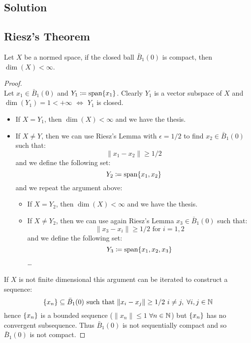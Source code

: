 \subsection*{Solution}

\subsection{Riesz's Theorem}
Let $X$ be a normed space, if the closed ball $\bar{B}_1(0)$ is compact, then $\dim(X)<\infty$.

\begin{proof}
    \hspace*{\fill}\\ %
    Let $x_1 \in \bar{B}_1(0)$ and $Y_1 \coloneqq \operatorname{span}\{x_1 \}$. Clearly $Y_1$ is a vector subspace of $X$ and $\dim(Y_1)=1<+\infty$ $\iff$ $Y_1$ is closed.
    \begin{itemize}
        \item If $X=Y_1$, then $\dim(X) < \infty$ and we have the thesis.
        \item If $X \neq Y$, then we can use Riesz's Lemma with $\epsilon = 1/2$ to find $x_2 \in \bar{B}_1(0)$ such that:
            \[ \| x_1 - x_2 \| \geq 1/2 \]
            and we define the following set:
            \[ Y_2 \coloneqq \operatorname{span}\{x_1, x_2 \} \]
        and we repeat the argument above:
        \begin{itemize}
            \item If $X=Y_2$, then $\dim(X) < \infty$ and we have the thesis.
            \item If $X \neq Y_2$, then we can use again Riesz's Lemma $x_3 \in \bar{B}_1(0)$ such that:
                \[ \| x_3 - x_i \| \geq 1/2 \text{ for } i=1,2 \]
                and we define the following set:
                \[ Y_3 \coloneqq \operatorname{span}\{x_1, x_2, x_3 \} \]
                \dots
        \end{itemize}
    \end{itemize}
    If $X$ is not finite dimensional this argument can be iterated to construct a sequence:
    \[ \{ x_n \} \subseteq \bar{B}_1(0) \text{ such that } \| x_i - x_j \| \geq 1/2 \text{ } i \neq j, \; \forall i,j \in \mathbb{N} \]
    hence $\{ x_n \}$ is a bounded sequence ($\|x_n\| \leq 1$ $\forall n \in \mathbb{N}$) but $\{ x_n \}$ has no convergent subsequence. Thus $\bar{B}_1(0)$ is not sequentially compact and so $\bar{B}_1(0)$ is not compact. 
\end{proof}


